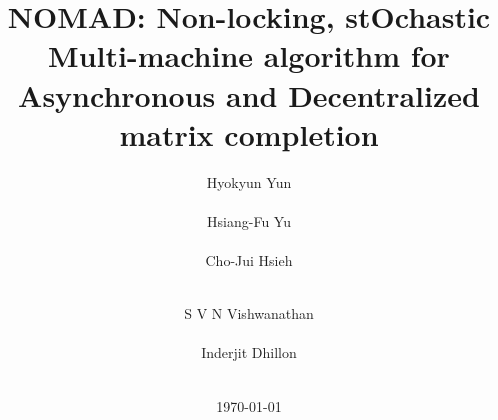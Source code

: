 \documentclass{vldb}
\begin{document}
  \newcommand{\ptrna}{crosshatch}
  \newcommand{\ptrnb}{north west lines}
  \newcommand{\ptrnc}{north east lines}
  \newcommand{\ptrnd}{horizontal lines}

  \newcommand{\ptcla}{red}
  \newcommand{\ptclb}{green}
  \newcommand{\ptclc}{blue}
  \newcommand{\ptcld}{brown}

  \newcommand{\drawrowpart}{
    \draw[pattern=\ptrnd, pattern color=\ptcld] 
    (-\gridwidth - \gridwidth * 0.25, 0 * \gridwidth) 
    rectangle 
    (- \gridwidth * 0.25, 
    0 * \gridwidth + 1 * \gridwidth);
    \draw[pattern=\ptrnc, pattern color=\ptclc] 
    (-\gridwidth - \gridwidth * 0.25, 
    1 * \gridwidth) 
    rectangle 
    (- \gridwidth * 0.25, 
    1 * \gridwidth + 1 * \gridwidth);
    
    \draw[pattern=\ptrnb, pattern color=\ptclb] 
    (-\gridwidth - \gridwidth * 0.25, 
    2 * \gridwidth) 
    rectangle 
    (- \gridwidth * 0.25, 
    2 * \gridwidth + 1 * \gridwidth);
    
    \draw[pattern=\ptrna, pattern color=\ptcla] 
    (-\gridwidth - \gridwidth * 0.25, 
    3 * \gridwidth) 
    rectangle 
    (- \gridwidth * 0.25, 
    3 * \gridwidth + 1 * \gridwidth);
  }
  
  \newcommand{\drawcolpart}[4]{
    \draw[pattern=#3, pattern color=#4] 
    (#1 * \asnwidth, 
    4 * \gridwidth + 0.25 * \gridwidth) 
    rectangle 
    (#2 * \asnwidth + \asnwidth, 
    4 * \gridwidth + 0.25 * \gridwidth + \gridwidth);
  }



\title{NOMAD: Non-locking, stOchastic Multi-machine algorithm
  for Asynchronous and Decentralized matrix completion}


\author{
  \alignauthor
  Hyokyun Yun \\ \\
  \alignauthor
  Hsiang-Fu Yu\\ 
  \\
  \alignauthor
  Cho-Jui Hsieh \\ \\
  \and 
  \alignauthor
  S V N Vishwanathan\\ \\
  \alignauthor
  Inderjit Dhillon \\ \\
}
\date{\today}
\end{document}
